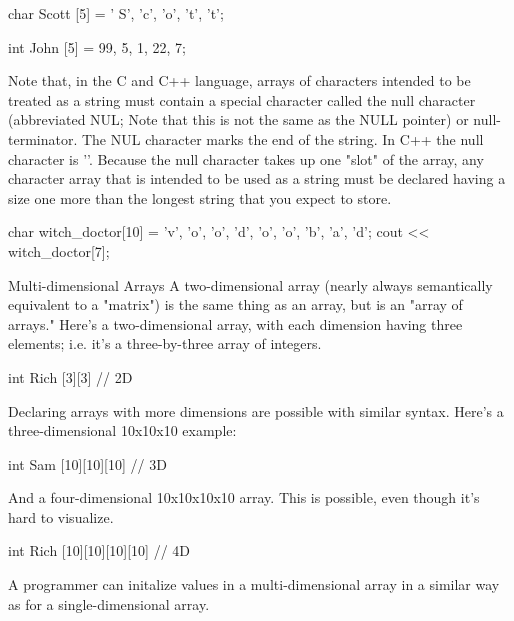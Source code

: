 {char Scott [5] = {' S', 'c', 'o', 't', 't'};	

int John [5] = {99, 5, 1, 22, 7};


	Note that, in the C and C++ language, arrays of characters intended to be treated as a string must contain a special character called the null character (abbreviated NUL; Note that this is not the same as the NULL pointer) or null-terminator. The NUL character marks the end of the string. In C++ the null character is '\0'. Because the null character takes up one "slot" of the array, any character array that is intended to be used as a string must be declared having a size one more than the longest string that you expect to store.

	char witch_doctor[10] = {'v', 'o', 'o', 'd', 'o', 'o', 'b', 'a', 'd'};
	cout << witch_doctor[7];


Multi-dimensional Arrays
A two-dimensional array (nearly always semantically equivalent to a "matrix") is the same thing as an array, but is an "array of arrays." Here's a two-dimensional array, with each dimension having three elements; i.e. it's a three-by-three array of integers.

int Rich [3][3] // 2D

Declaring arrays with more dimensions are possible with similar syntax. Here's a three-dimensional 10x10x10 example:

int Sam [10][10][10] // 3D

And a four-dimensional 10x10x10x10 array. This is possible, even though it's hard to visualize.

int Rich [10][10][10][10] // 4D

A programmer can initalize values in a multi-dimensional array in a similar way as for a single-dimensional array.

}
